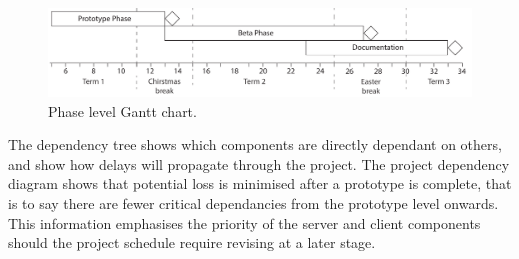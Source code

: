 \begin{figure}[h!]
	\includegraphics{res/gantt_chart_annotated}
	\caption{Phase level Gantt chart.}
\end{figure}

The dependency tree shows which components are directly dependant on others, and show how delays will propagate through the project. The project dependency diagram shows that potential loss is minimised after a prototype is complete, that is to say there are fewer critical dependancies from the prototype level onwards. This information emphasises the priority of the server and client components should the project schedule require revising at a later stage.





